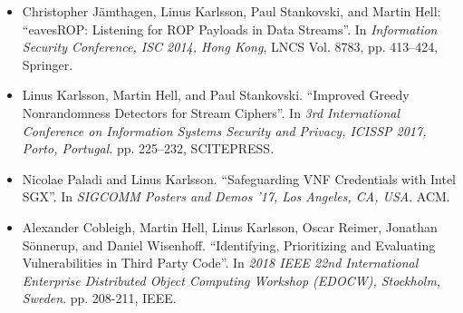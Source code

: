 \begin{itemize}
	\item Christopher Jämthagen, Linus Karlsson, Paul Stankovski, and Martin Hell: ``eavesROP: Listening for ROP Payloads in Data Streams''. In \emph{Information Security Conference, ISC 2014, Hong Kong}, LNCS Vol. 8783, pp. 413--424, Springer.
	\item Linus Karlsson, Martin Hell, and Paul Stankovski. ``Improved Greedy Nonrandomness Detectors for Stream Ciphers''. In \emph{3rd International Conference on Information Systems Security and Privacy, ICISSP 2017, Porto, Portugal}. pp. 225--232, SCITEPRESS.
	\item Nicolae Paladi and Linus Karlsson. ``Safeguarding VNF Credentials with Intel SGX''. In \emph{SIGCOMM Posters and Demos '17, Los Angeles, CA, USA}. ACM.
	\item Alexander Cobleigh, Martin Hell, Linus Karlsson, Oscar Reimer, Jonathan Sönnerup, and Daniel Wisenhoff. ``Identifying, Prioritizing and Evaluating Vulnerabilities in Third Party Code''. In \emph{2018 IEEE 22nd International Enterprise Distributed Object Computing Workshop (EDOCW), Stockholm, Sweden}. pp. 208-211, IEEE.
\end{itemize}


%
%
%
%
%



%
%




